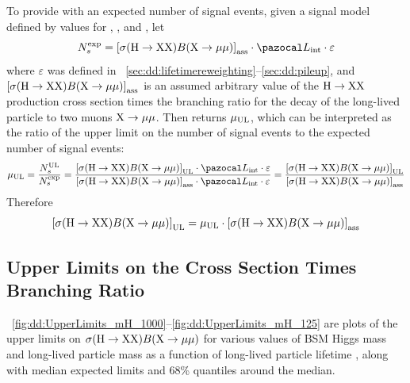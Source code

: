 To provide \combine with an expected number of \twoMu signal events, given a signal model defined by values for \mH, \mX, and \cTau, let
\begin{equation}
  N_s^\text{exp} = \left[\sigma(\PHiggs\to \PLLP\PLLP)B(\PLLP\to\Pgm\Pgm)\right]_\text{ass} \cdot \intlumi \cdot \varepsilon
  \label{eq:dd:nExp}
\end{equation}
where $\varepsilon$ was defined in \Secs~\ref{sec:dd:lifetimereweighting}--\ref{sec:dd:pileup}, and $\left[\sigma(\mathrm{H}\to \mathrm{X}\mathrm{X})B(\mathrm{X}\to\mathrm{\mu}\mathrm{\mu})\right]_\text{ass}$ is an assumed arbitrary value of the $\mathrm{H}\to \mathrm{X}\mathrm{X}$ production cross section times the branching ratio for the decay of the long-lived particle to two muons $\mathrm{X}\to\mathrm{\mu}\mathrm{\mu}$.
Then \combine returns $\mu_\text{UL}$, which can be interpreted as the ratio of the upper limit on the number of \twoMu signal events to the expected number of \twoMu signal events:
\begin{equation}
  \sigstr_\text{UL} = \frac{N_s^\text{UL}}{N_s^\text{exp}} = \frac{\left[\sigma(\PHiggs\to \PLLP\PLLP)B(\PLLP\to\Pgm\Pgm)\right]_\text{UL} \cdot \intlumi \cdot \varepsilon}{\left[\sigma(\PHiggs\to \PLLP\PLLP)B(\PLLP\to\Pgm\Pgm)\right]_\text{ass} \cdot \intlumi \cdot \varepsilon} = \frac{\left[\sigma(\PHiggs\to \PLLP\PLLP)B(\PLLP\to\Pgm\Pgm)\right]_\text{UL}}{\left[\sigma(\PHiggs\to \PLLP\PLLP)B(\PLLP\to\Pgm\Pgm)\right]_\text{ass}}
  \label{eq:dd:sigmaBfromSigStr}
\end{equation}
Therefore
\begin{equation}
  \left[\sigma(\mathrm{H}\to \mathrm{X}\mathrm{X})B(\mathrm{X}\to\mathrm{\mu}\mathrm{\mu})\right]_\text{UL} = \mu_\text{UL} \cdot \left[\sigma(\mathrm{H}\to \mathrm{X}\mathrm{X})B(\mathrm{X}\to\mathrm{\mu}\mathrm{\mu})\right]_\text{ass}
  \label{eq:dd:sigmaB}
\end{equation}

\subsection{Upper Limits on the Cross Section Times Branching Ratio}
\label{sec:dd:limits}
\Figs~\ref{fig:dd:UpperLimits_mH_1000}--\ref{fig:dd:UpperLimits_mH_125} are plots of the upper limits on $\sigma(\mathrm{H}\to \mathrm{X}\mathrm{X})B(\mathrm{X}\to\mathrm{\mu}\mathrm{\mu})$ for various values of BSM Higgs mass \mH and long-lived particle mass \mX as a function of long-lived particle lifetime \cTau, along with median expected limits and 68\% quantiles around the median.

